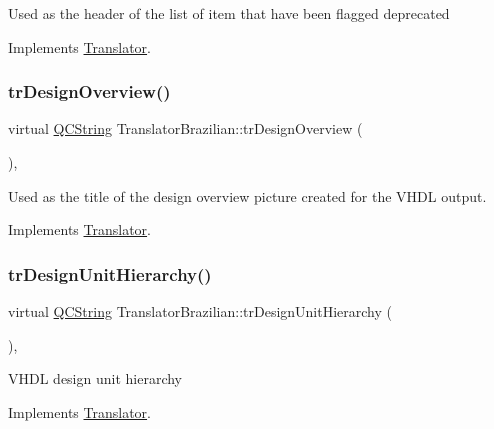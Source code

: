 Used as the header of the list of item that have been flagged deprecated 

Implements \mbox{\hyperlink{class_translator}{Translator}}.

\mbox{\label{class_translator_brazilian_a6c56d700811ad7ff20830d9b39981a77}} 
\subsubsection{\texorpdfstring{trDesignOverview()}{trDesignOverview()}}
{\footnotesize\ttfamily virtual \mbox{\hyperlink{class_q_c_string}{Q\+C\+String}} Translator\+Brazilian\+::tr\+Design\+Overview (\begin{DoxyParamCaption}{ }\end{DoxyParamCaption})\hspace{0.3cm}{\ttfamily [inline]}, {\ttfamily [virtual]}}

Used as the title of the design overview picture created for the V\+H\+DL output. 

Implements \mbox{\hyperlink{class_translator}{Translator}}.

\mbox{\label{class_translator_brazilian_a5dbd5be4d7a936f633c55eb7d085de49}} 
\subsubsection{\texorpdfstring{trDesignUnitHierarchy()}{trDesignUnitHierarchy()}}
{\footnotesize\ttfamily virtual \mbox{\hyperlink{class_q_c_string}{Q\+C\+String}} Translator\+Brazilian\+::tr\+Design\+Unit\+Hierarchy (\begin{DoxyParamCaption}{ }\end{DoxyParamCaption})\hspace{0.3cm}{\ttfamily [inline]}, {\ttfamily [virtual]}}

V\+H\+DL design unit hierarchy 

Implements \mbox{\hyperlink{class_translator}{Translator}}.

\mbox{\label{class_translator_brazilian_ac42aa7b09227dfed71f923c7f3adffc8}} 
